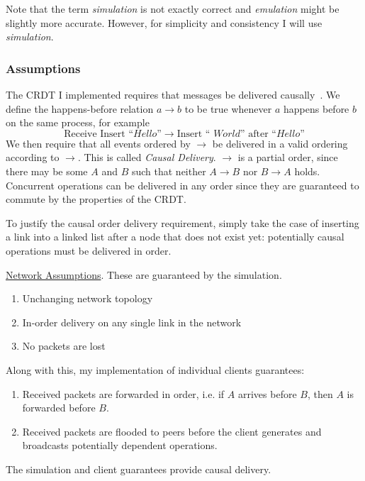 \documentclass[12pt,a4paper,twoside,openright]{report}
\begin{document}
		Note that the term \textit{simulation} is not exactly correct and \textit{emulation} might be slightly more accurate. However, for simplicity and consistency I will use \textit{simulation}.
		
		\subsubsection{Assumptions} \label{sec:networkassumptions}
		The CRDT I implemented requires that messages be delivered causally~\cite{concdistsystems}. We define the happens-before relation \(a \rightarrow b\) to be true whenever $a$ happens before $b$ on the same process, for example \[\text{Receive Insert ``} Hello \text{''} \rightarrow \text{Insert `` } World \text{'' after ``} Hello \text{''}\]
		We then require that all events ordered by $\rightarrow$ be delivered in a valid ordering according to $\rightarrow$. This is called \textit{Causal Delivery}. $\rightarrow$ is a partial order, since there may be some $A$ and $B$ such that neither $A \rightarrow B$ nor $B \rightarrow A$ holds. Concurrent operations can be delivered in any order since they are guaranteed to commute by the properties of the CRDT.
		
		To justify the causal order delivery requirement, simply take the case of inserting a link into a linked list after a node that does not exist yet: potentially causal operations must be delivered in order. 
		
		\underline{Network Assumptions}. These are guaranteed by the simulation.
		\begin{enumerate}
			\item Unchanging network topology
			\item In-order delivery on any single link in the network
			\item No packets are lost
		\end{enumerate}
		
		Along with this, my implementation of individual clients guarantees:
		\begin{enumerate}
			\item Received packets are forwarded in order, i.e. if $A$ arrives before $B$, then $A$ is forwarded before $B$.
			\item Received packets are flooded to peers before the client generates and broadcasts potentially dependent operations.
		\end{enumerate} 
		
		The simulation and client guarantees provide causal delivery.
		
\end{document}
